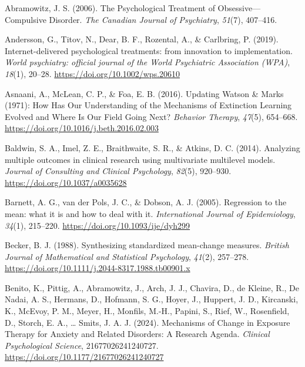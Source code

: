 \documentclass[
  man,floatsintext]{apa7}
\newlength{\cslhangindent}
\newlength{\cslentryspacingunit} %
\newenvironment{CSLReferences}[2] %
 {%
  \setlength{\parindent}{0pt}
  \ifodd #1
  \let\oldpar\par
  \def\par{\hangindent=\cslhangindent\oldpar}
  \fi
  \setlength{\parskip}{#2\cslentryspacingunit}
 }%
 {}
\begin{document}
\hypertarget{refs}{}
\begin{CSLReferences}{1}{0}
\leavevmode{}%
Abramowitz, J. S. (2006). The Psychological Treatment of Obsessive---Compulsive Disorder. \emph{The Canadian Journal of Psychiatry}, \emph{51}(7), 407--416.

\leavevmode{}%
Andersson, G., Titov, N., Dear, B. F., Rozental, A., \& Carlbring, P. (2019). Internet-delivered psychological treatments: from innovation to implementation. \emph{World psychiatry: official journal of the World Psychiatric Association (WPA)}, \emph{18}(1), 20--28. \url{https://doi.org/10.1002/wps.20610}

\leavevmode{}%
Asnaani, A., McLean, C. P., \& Foa, E. B. (2016). Updating Watson \& Marks (1971): How Has Our Understanding of the Mechanisms of Extinction Learning Evolved and Where Is Our Field Going Next? \emph{Behavior Therapy}, \emph{47}(5), 654--668. \url{https://doi.org/10.1016/j.beth.2016.02.003}

\leavevmode{}%
Baldwin, S. A., Imel, Z. E., Braithwaite, S. R., \& Atkins, D. C. (2014). Analyzing multiple outcomes in clinical research using multivariate multilevel models. \emph{Journal of Consulting and Clinical Psychology}, \emph{82}(5), 920--930. \url{https://doi.org/10.1037/a0035628}

\leavevmode{}%
Barnett, A. G., van der Pols, J. C., \& Dobson, A. J. (2005). Regression to the mean: what it is and how to deal with it. \emph{International Journal of Epidemiology}, \emph{34}(1), 215--220. \url{https://doi.org/10.1093/ije/dyh299}

\leavevmode{}%
Becker, B. J. (1988). Synthesizing standardized mean-change measures. \emph{British Journal of Mathematical and Statistical Psychology}, \emph{41}(2), 257--278. \url{https://doi.org/10.1111/j.2044-8317.1988.tb00901.x}

\leavevmode{}%
Benito, K., Pittig, A., Abramowitz, J., Arch, J. J., Chavira, D., de Kleine, R., De Nadai, A. S., Hermans, D., Hofmann, S. G., Hoyer, J., Huppert, J. D., Kircanski, K., McEvoy, P. M., Meyer, H., Monfils, M.-H., Papini, S., Rief, W., Rosenfield, D., Storch, E. A., \ldots{} Smits, J. A. J. (2024). Mechanisms of Change in Exposure Therapy for Anxiety and Related Disorders: A Research Agenda. \emph{Clinical Psychological Science}, 21677026241240727. \url{https://doi.org/10.1177/21677026241240727}


\end{CSLReferences}
\end{document}
